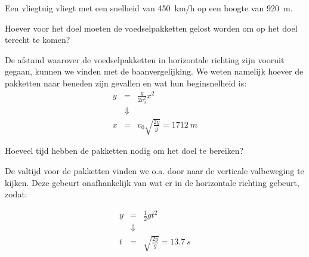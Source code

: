 \documentclass{ximera}
\begin{document}
\begin{example}
	Een vliegtuig vliegt met een snelheid van \SI{450}{km/h} op een hoogte van \SI{920}{m}.
	\begin{question} Hoever voor het doel moeten de voedselpakketten gelost worden om op het doel terecht te komen? 
		\begin{oplossing}  
			De afstand waarover de voedselpakketten in horizontale richting zijn vooruit gegaan, kunnen we vinden met de baanvergelijking. We weten namelijk hoever de pakketten naar beneden zijn gevallen en wat hun beginsnelheid is:
			\begin{eqnarray*}
				y&=&\frac{g}{2v_0^2}x^2\\
				&\Downarrow&\\
				x&=&v_0\sqrt{\frac{2y}{g}}=\SI{1712}{m}
			\end{eqnarray*}
		
		\end{oplossing} 
	\end{question}

	\begin{question} Hoeveel tijd hebben de pakketten nodig om het doel te bereiken?                                
		\begin{oplossing}  
		De valtijd voor de pakketten vinden we o.a. door naar de verticale valbeweging te kijken. Deze gebeurt onafhankelijk van wat er in de horizontale richting gebeurt, zodat:

			\begin{eqnarray*}
				y&=&\frac{1}{2}gt^2\\
				&\Downarrow&\\
				t&=&\sqrt{\frac{2y}{g}}=\SI{13,7}{s}
			\end{eqnarray*}
		\end{oplossing} 
	\end{question}




\end{example}
	
\end{document}
